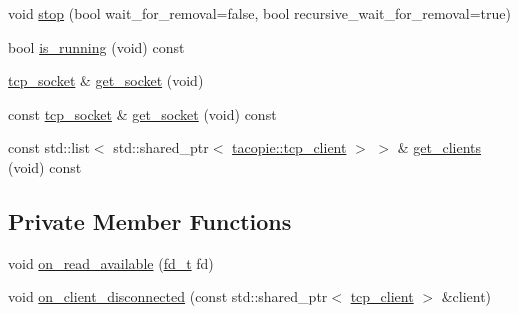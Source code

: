 \begin{DoxyCompactItemize}
void \hyperlink{classtacopie_1_1tcp__server_abc099e162432e2218faed93fc84180fd}{stop} (bool wait\+\_\+for\+\_\+removal=false, bool recursive\+\_\+wait\+\_\+for\+\_\+removal=true)
\item 
bool \hyperlink{classtacopie_1_1tcp__server_a76162141e6443953f3ad8e11c4e4d3d7}{is\+\_\+running} (void) const
\item 
\hyperlink{classtacopie_1_1tcp__socket}{tcp\+\_\+socket} \& \hyperlink{classtacopie_1_1tcp__server_a39a51b9203d42babfd9c4c1a0f4cc340}{get\+\_\+socket} (void)
\item 
const \hyperlink{classtacopie_1_1tcp__socket}{tcp\+\_\+socket} \& \hyperlink{classtacopie_1_1tcp__server_a373aec294e24a52c3ef6c44920af36e2}{get\+\_\+socket} (void) const
\item 
const std\+::list$<$ std\+::shared\+\_\+ptr$<$ \hyperlink{classtacopie_1_1tcp__client}{tacopie\+::tcp\+\_\+client} $>$ $>$ \& \hyperlink{classtacopie_1_1tcp__server_a0df81b943243ad51102c37d4944be8d7}{get\+\_\+clients} (void) const
\end{DoxyCompactItemize}
\subsection*{Private Member Functions}
\begin{DoxyCompactItemize}
\item 
void \hyperlink{classtacopie_1_1tcp__server_a62b4b67ab9554b27881be8dbe869cc6e}{on\+\_\+read\+\_\+available} (\hyperlink{namespacetacopie_acce7ad26b2d30156b1e6fa353f727026}{fd\+\_\+t} fd)
\item 
void \hyperlink{classtacopie_1_1tcp__server_ad98bdefae28be6b16a213bf5bedbf7d9}{on\+\_\+client\+\_\+disconnected} (const std\+::shared\+\_\+ptr$<$ \hyperlink{classtacopie_1_1tcp__client}{tcp\+\_\+client} $>$ \&client)
\end{DoxyCompactItemize}
